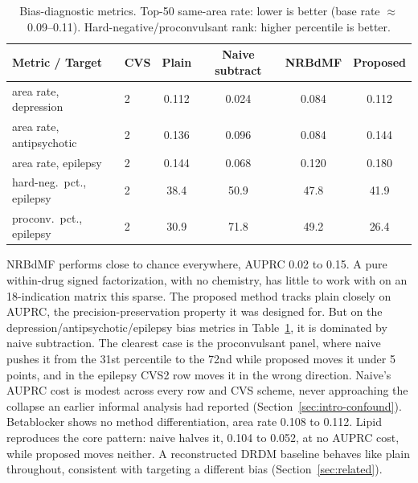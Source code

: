 \documentclass{llncs}
\begin{document}
\begin{table}[t]
\centering
\small
\caption{Bias-diagnostic metrics. Top-50 same-area rate: lower is better (base rate $\approx$ 0.09--0.11). Hard-negative/proconvulsant rank: higher percentile is better.}
\label{tab:main-bias}
\begin{tabular}{llcccc}
\toprule
Metric / Target & CVS & Plain & Naive subtract & NRBdMF & Proposed \\
\midrule
area rate, depression & 2 & 0.112 & 0.024 & 0.084 & 0.112 \\
area rate, antipsychotic & 2 & 0.136 & 0.096 & 0.084 & 0.144 \\
area rate, epilepsy & 2 & 0.144 & 0.068 & 0.120 & 0.180 \\
hard-neg.\ pct., epilepsy & 2 & 38.4 & 50.9 & 47.8 & 41.9 \\
proconv.\ pct., epilepsy & 2 & 30.9 & 71.8 & 49.2 & 26.4 \\
\bottomrule
\end{tabular}
\end{table}

NRBdMF performs close to chance everywhere, AUPRC 0.02 to 0.15. A pure within-drug signed factorization, with no chemistry, has little to work with on an 18-indication matrix this sparse. The proposed method tracks plain closely on AUPRC, the precision-preservation property it was designed for. But on the depression/antipsychotic/epilepsy bias metrics in Table~\ref{tab:main-bias}, it is dominated by naive subtraction. The clearest case is the proconvulsant panel, where naive pushes it from the 31st percentile to the 72nd while proposed moves it under 5 points, and in the epilepsy CVS2 row moves it in the wrong direction. Naive's AUPRC cost is modest across every row and CVS scheme, never approaching the collapse an earlier informal analysis had reported (Section~\ref{sec:intro-confound}). Betablocker shows no method differentiation, area rate 0.108 to 0.112. Lipid reproduces the core pattern: naive halves it, 0.104 to 0.052, at no AUPRC cost, while proposed moves neither. A reconstructed DRDM baseline behaves like plain throughout, consistent with targeting a different bias (Section~\ref{sec:related}).
\end{document}
